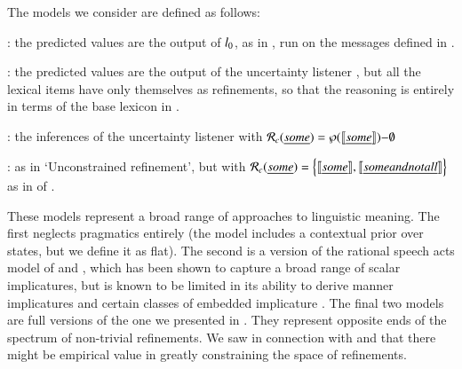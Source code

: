 \documentclass[leqno,12pt]{article}
\begin{document}
The models we consider are defined as follows:
%
\begin{examples}
\item 
  \begin{examples}
  \item {}: the predicted values are the output
    of $l_{0}$, as in , run on the messages
    defined in .
  \item {}: the predicted values are the
    output of the uncertainty listener , but all the
    lexical items have only themselves as refinements, so that the
    reasoning is entirely in terms of the base lexicon in
    .
  \item {}: the inferences of the
    uncertainty listener  with $\mathcal{R}_{c}(\emph{some})
    = \wp(\llbracket\emph{some}\rrbracket){-}\emptyset$
  \item {}: as in `Unconstrained
    refinement', but with
    $\mathcal{R}_{c}(\emph{some}) = \left\{ \llbracket\emph{some}\rrbracket, \llbracket\emph{some
          and not all}\rrbracket \right\}$
    as in  of .
  \end{examples}
\end{examples}

These models represent a broad range of approaches to linguistic
meaning. The first neglects pragmatics entirely (the model includes a
contextual prior over states, but we define it as flat). The second is
a version of the rational speech acts model of
\citet{Frank:Goodman:2012} and \citet{Goodman:Stuhlmuller:2013}, which
has been shown to capture a broad range of scalar implicatures, but is
known to be limited in its ability to derive manner implicatures and
certain classes of embedded implicature
\citep{Bergen:Goodman:Levy:2012,Bergen:Levy:Goodman:2014}. The final
two models are full versions of the one we presented in
. They represent opposite ends of the spectrum of
non-trivial refinements. We saw in connection with
 and  that there
might be empirical value in greatly constraining the space of
refinements.  
\end{document}
